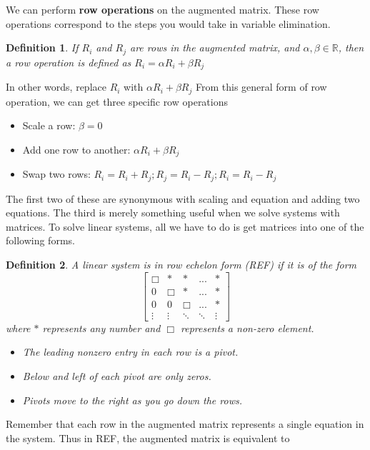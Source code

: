 \documentclass{article}
\newtheorem{definition}{Definition}
\begin{document}
    We can perform \textbf{row operations} on the augmented matrix. These row operations correspond to the steps you would take in variable elimination.
    \begin{definition}
        If $R_i$ and $R_j$ are rows in the augmented matrix, and $\alpha, \beta \in \mathbb{R}$, then a row operation is defined as $R_i=\alpha R_i +\beta R_j$
    \end{definition}
    In other words, replace $R_i$ with $\alpha R_i + \beta R_j$
    From this general form of row operation, we can get three specific row operations
    \begin{itemize}
        \item Scale a row: $\beta=0$
        \item Add one row to another: $\alpha R_i + \beta R_j$
        \item Swap two rows: $R_i=R_i+R_j; R_j=R_i-R_j; R_i=R_i-R_j$
    \end{itemize}
    The first two of these are synonymous with scaling and equation and adding two equations. The third is merely something useful when we solve systems with matrices.
    To solve linear systems, all we have to do is get matrices into one of the following forms.
    \begin{definition}
        A linear system is in row echelon form (REF) if it is of the form
        \[
            \left[
            \begin{array}{cccc|c}
            \Box & * & * & ... & * \\
            0 & \Box & * & ... & * \\
            0 & 0 & \Box & ... & * \\
            \vdots & \vdots & \ddots & \ddots & \vdots
            \end{array}
            \right]
        \] 
        where $*$ represents any number and $\Box$ represents a non-zero element.
        \begin{itemize}
            \item The leading nonzero entry in each row is a pivot. 
            \item Below and left of each pivot are only zeros. 
            \item Pivots move to the right as you go down the rows.
        \end{itemize}
    \end{definition}
    Remember that each row in the augmented matrix represents a single equation in the system. Thus in REF, the augmented matrix is equivalent to
\end{document}
